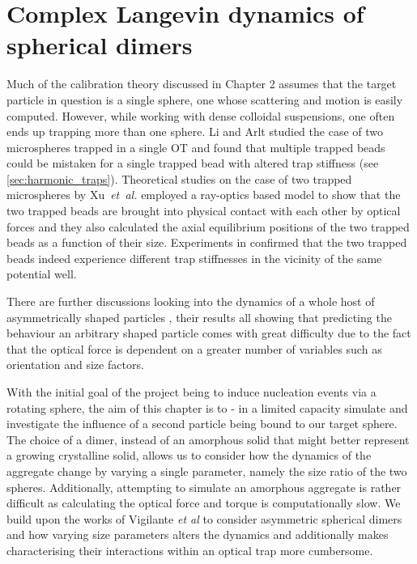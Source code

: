 \chapter{Complex Langevin dynamics of spherical dimers}
\label{chapter:langevin_dynamics}
Much of the calibration theory discussed in Chapter 2 
assumes that the target particle in question is a single 
sphere, one whose scattering and motion is easily computed. 
However, while working with dense colloidal suspensions, 
one often ends up trapping more than one sphere. Li and 
Arlt \cite{Li2008} studied the case of two microspheres 
trapped in a single OT and found that multiple trapped 
beads could be mistaken for a single trapped bead with 
altered trap stiffness (see \ref{sec:harmonic_traps}). 
Theoretical studies on the case of two trapped microspheres 
by Xu~\textit{et~al.} \cite{Xu2005} employed a ray-optics 
based model to show that the two trapped beads are brought 
into physical contact with each other by optical forces 
and they also calculated the axial equilibrium positions 
of the two trapped beads as a function of their size. 
Experiments in \cite{Praveen2016} confirmed that the two 
trapped beads indeed experience different trap stiffnesses 
in the vicinity of the same potential well.
 
There are further discussions looking into the dynamics of 
a whole host of asymmetrically shaped particles \cite{Loudet2014, 
ShengHua2005, Chetana2022}, their results all showing that 
predicting the behaviour an arbitrary shaped particle comes 
with great difficulty due to the fact that the optical force 
is dependent on a greater number of variables such as 
orientation and size factors.

With the initial goal of the project being to induce 
nucleation events via a rotating sphere, the aim of this 
chapter is to - in a limited capacity simulate and investigate 
the influence of a second particle being bound to our target 
sphere. The choice of a dimer, instead of an amorphous solid 
that might better represent a growing crystalline solid, 
allows us to consider how the dynamics of the aggregate change 
by varying a single parameter, namely the size ratio of the 
two spheres. Additionally, attempting to simulate an amorphous 
aggregate is rather difficult as calculating the optical force 
and torque is computationally slow. We build upon the works of 
Vigilante \textit{et al} \cite{Vigilante2020} to consider 
asymmetric spherical dimers and how varying size parameters 
alters the dynamics and additionally makes characterising their 
interactions within an optical trap more cumbersome. 

